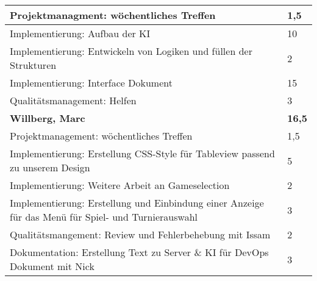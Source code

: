 \documentclass[a4paper,11pt]{scrartcl}
\begin{document}
\begin{longtable}{| p{13.8cm} | C{2.4cm} |}
  Projektmanagment: wöchentliches Treffen
	&
  1,5
	\\
	\hline

  Implementierung: Aufbau der KI
	&
  10
	\\
	\hline

  Implementierung: Entwickeln von Logiken und füllen der Strukturen
	&
  2
	\\
	\hline

  Implementierung: Interface Dokument
	&
  15
	\\
	\hline

  Qualitätsmanagement: Helfen
	&
  3
	\\
	\hline
	\hline


	\textbf{Willberg, Marc} & \textbf{16,5}\\ %
	\hline

  Projektmanagement: wöchentliches Treffen
	&
  1,5
	\\
	\hline

  Implementierung: Erstellung CSS-Style für Tableview passend zu unserem Design
	&
  5
	\\
	\hline

  Implementierung: Weitere Arbeit an Gameselection
	&
  2
	\\
	\hline

  Implementierung: Erstellung und Einbindung einer Anzeige für das Menü für Spiel- und Turnierauswahl
	&
  3
	\\
	\hline

  Qualitätsmangement: Review und Fehlerbehebung mit Issam
	&
  2
	\\
	\hline

  Dokumentation: Erstellung Text zu Server \& KI für DevOps Dokument mit Nick
	&
  3
	\\
	\hline

\end{longtable}
\end{document}
